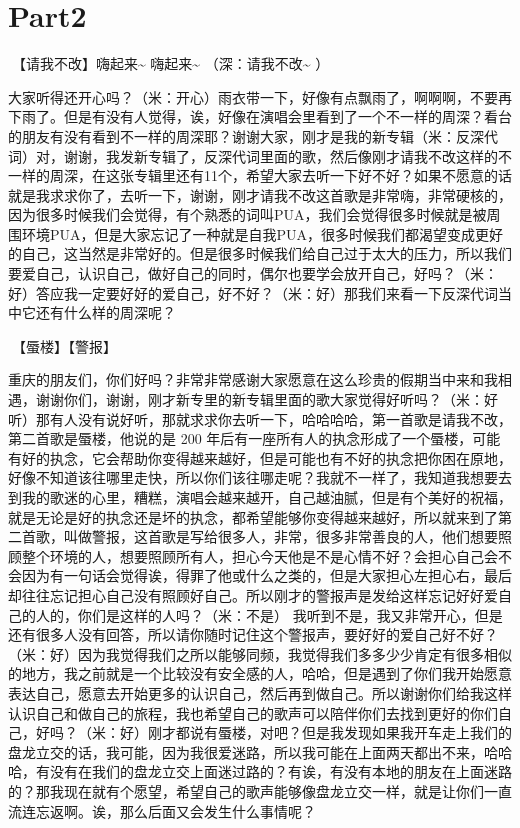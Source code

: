 \documentclass[
]{book}
\begin{document}
\section{Part2}\label{chongqing-20241006-part2}

🎵【请我不改】嗨起来\textasciitilde{} 嗨起来\textasciitilde{} （深：请我不改\textasciitilde{} ）

大家听得还开心吗？（米：开心）雨衣带一下，好像有点飘雨了，啊啊啊，不要再下雨了。但是有没有人觉得，诶，好像在演唱会里看到了一个不一样的周深？看台的朋友有没有看到不一样的周深耶？谢谢大家，刚才是我的新专辑（米：反深代词）对，谢谢，我发新专辑了，反深代词里面的歌，然后像刚才请我不改这样的不一样的周深，在这张专辑里还有11个，希望大家去听一下好不好？如果不愿意的话就是我求求你了，去听一下，谢谢，刚才请我不改这首歌是非常嗨，非常硬核的，因为很多时候我们会觉得，有个熟悉的词叫PUA，我们会觉得很多时候就是被周围环境PUA，但是大家忘记了一种就是自我PUA，很多时候我们都渴望变成更好的自己，这当然是非常好的。但是很多时候我们给自己过于太大的压力，所以我们要爱自己，认识自己，做好自己的同时，偶尔也要学会放开自己，好吗？（米：好）答应我一定要好好的爱自己，好不好？（米：好）那我们来看一下反深代词当中它还有什么样的周深呢？

🎵【蜃楼】【警报】

重庆的朋友们，你们好吗？非常非常感谢大家愿意在这么珍贵的假期当中来和我相遇，谢谢你们，谢谢，刚才新专里的新专辑里面的歌大家觉得好听吗？（米：好听）那有人没有说好听，那就求求你去听一下，哈哈哈哈，第一首歌是请我不改，第二首歌是蜃楼，他说的是 200 年后有一座所有人的执念形成了一个蜃楼，可能有好的执念，它会帮助你变得越来越好，但是可能也有不好的执念把你困在原地，好像不知道该往哪里走快，所以你们该往哪走呢？我就不一样了，我知道我想要去到我的歌迷的心里，糟糕，演唱会越来越开，自己越油腻，但是有个美好的祝福，就是无论是好的执念还是坏的执念，都希望能够你变得越来越好，所以就来到了第二首歌，叫做警报，这首歌是写给很多人，非常，很多非常善良的人，他们想要照顾整个环境的人，想要照顾所有人，担心今天他是不是心情不好？会担心自己会不会因为有一句话会觉得诶，得罪了他或什么之类的，但是大家担心左担心右，最后却往往忘记担心自己没有照顾好自己。所以刚才的警报声是发给这样忘记好好爱自己的人的，你们是这样的人吗？（米：不是） 我听到不是，我又非常开心，但是还有很多人没有回答，所以请你随时记住这个警报声，要好好的爱自己好不好？（米：好）因为我觉得我们之所以能够同频，我觉得我们多多少少肯定有很多相似的地方，我之前就是一个比较没有安全感的人，哈哈，但是遇到了你们我开始愿意表达自己，愿意去开始更多的认识自己，然后再到做自己。所以谢谢你们给我这样认识自己和做自己的旅程，我也希望自己的歌声可以陪伴你们去找到更好的你们自己，好吗？（米：好）刚才都说有蜃楼，对吧？但是我发现如果我开车走上我们的盘龙立交的话，我可能，因为我很爱迷路，所以我可能在上面两天都出不来，哈哈哈，有没有在我们的盘龙立交上面迷过路的？有诶，有没有本地的朋友在上面迷路的？那我现在就有个愿望，希望自己的歌声能够像盘龙立交一样，就是让你们一直流连忘返啊。诶，那么后面又会发生什么事情呢？
\end{document}
